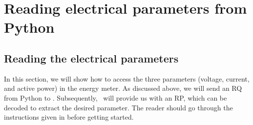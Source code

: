 


\section{Reading electrical parameters from Python}
\subsection{Reading the electrical parameters}
In this section, we will show how to access the three parameters (voltage, current, and active power) in the energy meter. As discussed above, we will send an RQ from Python to \arduino. Subsequently, \arduino\ will provide us with an RP, which can be decoded to extract the desired parameter. The reader should go through the instructions given in  before getting started. 

